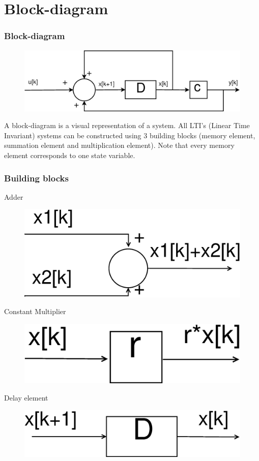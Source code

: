 \section{Block-diagram}
\begin{frame}
	\frametitle{Block-diagram}
\begin{figure}
\centering
\includegraphics[width=0.7\linewidth]{Images/Discrete_time_eps_3.eps}
\end{figure}


	\vspace{-1.5em}
	\begin{definition}
			A block-diagram is a visual representation of a system. All LTI's (Linear Time Invariant) systems can be constructed using 3 building blocks (memory element, summation element and multiplication element). Note that every memory element corresponds to one state variable.
	\end{definition}
\end{frame}
\begin{frame}
	\frametitle{Building blocks}
	
			\begin{block}{Adder}
			\begin{figure}
				\centering
				\includegraphics[width=0.3\linewidth]{Images/Discrete_time_eps_5.eps}
				
			\end{figure}
%			

			\end{block}
		
		
				\begin{block}{Constant Multiplier}
					\begin{figure}
					\centering
					\includegraphics[width=0.3\linewidth]{Images/Discrete_time_eps_6.eps}
					\end{figure}
				\end{block}
	
			\begin{block}{Delay element}
				\begin{figure}
					\centering
					\includegraphics[width=0.3\linewidth]{Images/Discrete_time_eps_7.eps}
				\end{figure}
			\end{block}
	
\end{frame}
